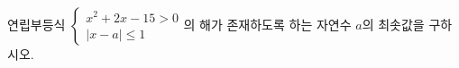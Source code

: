 \hspace*{2mm}\begin{minipage}[t]{\dimexpr\linewidth-2mm\relax}\vspace{0pt}
연립부등식 $\begin{cases} x^2+2x-15>0 \\ |x-a|\le 1 \end{cases}$의 해가 존재하도록 하는 자연수 $a$의 최솟값을 구하시오.\end{minipage}
